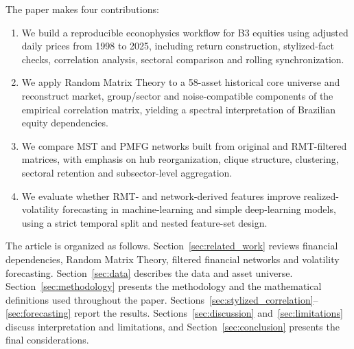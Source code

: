 The paper makes four contributions:
\begin{enumerate}
  \item We build a reproducible econophysics workflow for B3 equities using adjusted daily prices from 1998 to 2025, including return construction, stylized-fact checks, correlation analysis, sectoral comparison and rolling synchronization.
  \item We apply Random Matrix Theory to a 58-asset historical core universe and reconstruct market, group/sector and noise-compatible components of the empirical correlation matrix, yielding a spectral interpretation of Brazilian equity dependencies.
  \item We compare MST and PMFG networks built from original and RMT-filtered matrices, with emphasis on hub reorganization, clique structure, clustering, sectoral retention and subsector-level aggregation.
  \item We evaluate whether RMT- and network-derived features improve realized-volatility forecasting in machine-learning and simple deep-learning models, using a strict temporal split and nested feature-set design.
\end{enumerate}

The article is organized as follows. Section~\ref{sec:related_work} reviews financial dependencies, Random Matrix Theory, filtered financial networks and volatility forecasting. Section~\ref{sec:data} describes the data and asset universe. Section~\ref{sec:methodology} presents the methodology and the mathematical definitions used throughout the paper. Sections~\ref{sec:stylized_correlation}--\ref{sec:forecasting} report the results. Sections~\ref{sec:discussion} and~\ref{sec:limitations} discuss interpretation and limitations, and Section~\ref{sec:conclusion} presents the final considerations.
